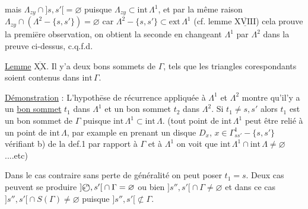 mais $\Lambda_{zy}\cap{]s,s'[}=\varnothing$ puisque $\Lambda_{zy}\subset\mathrm{int}\,\Lambda^1$, et par la même raison $\Lambda_{zy}\cap(\Lambda^2-\{s,s'\})=\varnothing$ car $\Lambda^2-\{s,s'\}\subset\mathrm{ext}\,\Lambda^1$ (cf. lemme $\overline{\underline{\mathrm{XVIII}}}$) cela prouve la premiēre observation, on obtient la seconde en changeant $\Lambda^1$ par $\Lambda^2$ dans la preuve ci-dessus, c.q.f.d.

\uline{Lemme} $\overline{\underline{\mathrm{XX}}}$. Il y'a deux bons sommets de $\Gamma$,   tels que les  triangles corespondants soient contenus dans $\mathrm{int}\,\Gamma$.

\uline{Démonstration} : L'hypothēse de récurrence appliquée à $\Lambda^1$ et $\Lambda^2$ montre qu'il'y a un \uline{bon sommet} %
$t_1$ dans $\Lambda^1$ et un bon sommet $t_2$ dans $\Lambda^2$. Si $t_1\ne s,s'$ alors $t_1$ est un bon sommet de $\Gamma$ puisque $\mathrm{int}\,\Lambda^1\subset\mathrm{int}\,\Lambda$. (tout point de $\mathrm{int}\,\Lambda^1$ peut être relié à un point de $\mathrm{int}\,\Lambda$, par example en prenant un disque $D_x$, $x\in\Gamma^{1}_{ss'}-\{s,s'\}$ vérifiant b) de la def.1 par rapport à $\Gamma$ et à $\Lambda^1$ on voit que $\mathrm{int}\,\Lambda^1\cap\mathrm{int}\,\Lambda\ne\varnothing$....etc)

Dans le cas contraire sans perte de généralité on peut poser $t_1=s$. Deux cas peuvent se produire $ {]\text{\textcircled{\scriptsize \(s''\)}},s'[}\cap\Gamma=\varnothing$ ou bien $ {]s'',s'[}\cap\Gamma\ne\varnothing$ et dans ce cas $ {]s'',s'[}\cap S(\Gamma)\ne\varnothing$ puisque $ {]s'',s'[}\not\subset\Gamma$.

